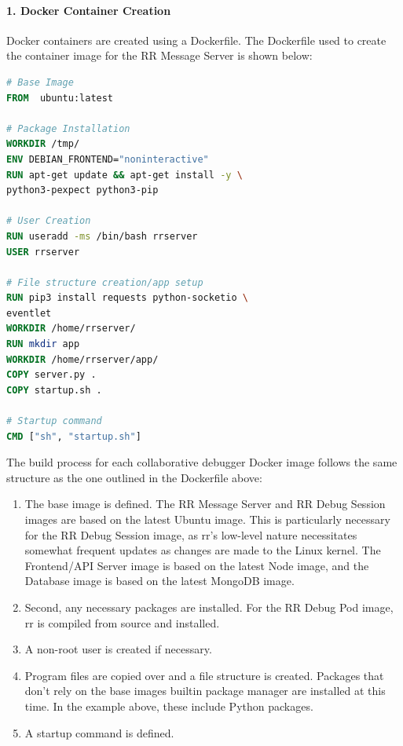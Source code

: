 \documentclass[12pt]{article}
\begin{document}
\paragraph{1. Docker Container Creation}

Docker containers are created using a Dockerfile.  The Dockerfile used
to create the container image for the RR Message
Server is shown below:

\begin{lstlisting}[language=Dockerfile,caption={RR Message Server Dockerfile},captionpos=b]
# Base Image
FROM  ubuntu:latest

# Package Installation
WORKDIR /tmp/
ENV DEBIAN_FRONTEND="noninteractive"
RUN apt-get update && apt-get install -y \
python3-pexpect python3-pip

# User Creation
RUN useradd -ms /bin/bash rrserver
USER rrserver

# File structure creation/app setup
RUN pip3 install requests python-socketio \
eventlet
WORKDIR /home/rrserver/
RUN mkdir app
WORKDIR /home/rrserver/app/
COPY server.py .
COPY startup.sh .

# Startup command
CMD ["sh", "startup.sh"]
\end{lstlisting}

The build process for each collaborative debugger Docker image follows
the same structure as the one outlined in the Dockerfile above:

\begin{enumerate}
\item The base image is defined. The RR Message Server and RR Debug
  Session images are based on the latest Ubuntu image.  This is
  particularly necessary for the RR Debug Session image, as rr's
  low-level nature necessitates somewhat frequent updates as changes
  are made to the Linux kernel.  The Frontend/API Server image is
  based on the latest Node image, and the Database image is based on
  the latest MongoDB image.
\item Second, any necessary packages are installed.  For the RR Debug
  Pod image, rr is compiled from source and installed.
\item A non-root user is created if necessary.
\item Program files are copied over and a file structure is created.
  Packages that don't rely on the base images builtin package manager
  are installed at this time.  In the example above, these include
  Python packages.
\item A startup command is defined.
\end{enumerate}
\end{document}
